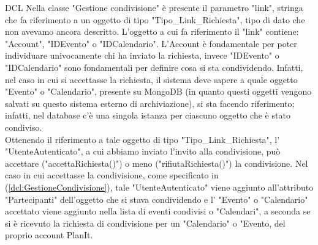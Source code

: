 \begin{listaPersonale}{DCL}
    Nella classe "Gestione condivisione" è presente il parametro "link", stringa che fa riferimento a un oggetto di tipo "Tipo\_Link\_Richiesta", tipo di dato che non avevamo ancora descritto.
    L'oggetto a cui fa riferimento il "link" contiene: "Account", "IDEvento" o "IDCalendario". L'Account è fondamentale per poter individuare univocamente chi ha inviato la richiesta, invece "IDEvento" o "IDCalendario" sono fondamentali per definire cosa si sta condividendo. Infatti, nel caso in cui si accettasse la richiesta, il sistema deve sapere a quale oggetto "Evento" o "Calendario", presente su MongoDB (in quanto questi oggetti vengono salvati su questo sistema esterno di archiviazione), si sta facendo riferimento; infatti, nel database c'è una singola istanza per ciascuno oggetto che è stato condiviso.\\
    Ottenendo il riferimento a tale oggetto di tipo "Tipo\_Link\_Richiesta", l' "UtenteAutenticato", a cui abbiamo inviato l'invito alla condivisione, può accettare ("accettaRichiesta()") o meno ("rifiutaRichiesta()") la condivisione. Nel caso in cui accettasse la condivisione, come specificato in (\ref{dcl:GestioneCondivisione}), tale "UtenteAutenticato" viene aggiunto all'attributo "Partecipanti" dell'oggetto che si stava condividendo e l' "Evento" o "Calendario" accettato viene aggiunto nella lista di eventi condivisi o "Calendari", a seconda se si è ricevuto la richiesta di condivisione per un "Calendario" o "Evento, del proprio account PlanIt.



\end{listaPersonale}
